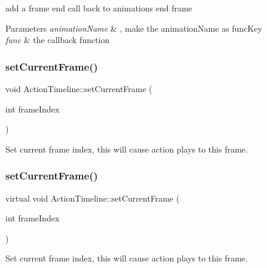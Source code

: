 add a frame end call back to animation\textquotesingle{}s end frame 
\begin{DoxyParams}{Parameters}
{\em animation\+Name} & , make the animation\+Name as func\+Key \\
\hline
{\em func} & the callback function \\
\hline
\end{DoxyParams}
\mbox{\label{classActionTimeline_a9d441e0d690412dba118ae4f98457149}} 
\subsubsection{\texorpdfstring{set\+Current\+Frame()}{setCurrentFrame()}\hspace{0.1cm}{\footnotesize\ttfamily [1/2]}}
{\footnotesize\ttfamily void Action\+Timeline\+::set\+Current\+Frame (\begin{DoxyParamCaption}\item[{int}]{frame\+Index }\end{DoxyParamCaption})\hspace{0.3cm}{\ttfamily [virtual]}}

Set current frame index, this will cause action plays to this frame. \mbox{\label{classActionTimeline_aee2a888d66f69abb18e550cbfa3d9358}} 
\subsubsection{\texorpdfstring{set\+Current\+Frame()}{setCurrentFrame()}\hspace{0.1cm}{\footnotesize\ttfamily [2/2]}}
{\footnotesize\ttfamily virtual void Action\+Timeline\+::set\+Current\+Frame (\begin{DoxyParamCaption}\item[{int}]{frame\+Index }\end{DoxyParamCaption})\hspace{0.3cm}{\ttfamily [virtual]}}

Set current frame index, this will cause action plays to this frame. \mbox{\label{classActionTimeline_ab1e49839f767641b62e2a450269fb5b8}} 
